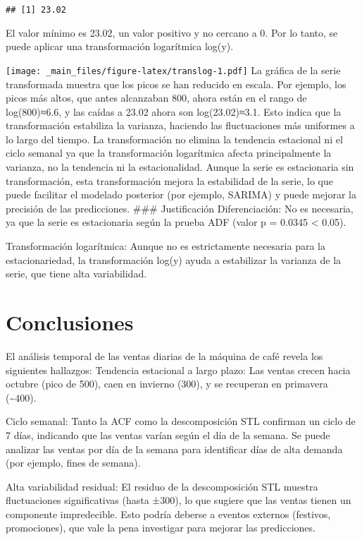 \documentclass[
]{book}
\begin{document}
\begin{verbatim}
## [1] 23.02
\end{verbatim}

El valor mínimo es 23.02, un valor positivo y no cercano a 0. Por lo tanto, se puede aplicar una transformación logarítmica log⁡(y).

\texttt{[image: \_main\_files/figure-latex/translog-1.pdf]}
La gráfica de la serie transformada muestra que los picos se han reducido en escala. Por ejemplo, los picos más altos, que antes alcanzaban 800, ahora están en el rango de log⁡(800)≈6.6, y las caídas a 23.02 ahora son log⁡(23.02)≈3.1. Esto indica que la transformación estabiliza la varianza, haciendo las fluctuaciones más uniformes a lo largo del tiempo. La transformación no elimina la tendencia estacional ni el ciclo semanal ya que la transformación logarítmica afecta principalmente la varianza, no la tendencia ni la estacionalidad.
Aunque la serie es estacionaria sin transformación, esta transformación mejora la estabilidad de la serie, lo que puede facilitar el modelado posterior (por ejemplo, SARIMA) y puede mejorar la precisión de las predicciones.
\#\#\# Justificación
Diferenciación: No es necesaria, ya que la serie es estacionaria según la prueba ADF (valor p = 0.0345 \textless{} 0.05).

Transformación logarítmica: Aunque no es estrictamente necesaria para la estacionariedad, la transformación log⁡(y)
ayuda a estabilizar la varianza de la serie, que tiene alta variabilidad.

\section{Conclusiones}\label{conclusiones}

El análisis temporal de las ventas diarias de la máquina de café revela los siguientes hallazgos:
Tendencia estacional a largo plazo: Las ventas crecen hacia octubre (pico de 500), caen en invierno (300), y se recuperan en primavera (\textasciitilde400).

Ciclo semanal: Tanto la ACF como la descomposición STL confirman un ciclo de 7 días, indicando que las ventas varían según el día de la semana. Se puede analizar las ventas por día de la semana para identificar días de alta demanda (por ejemplo, fines de semana).

Alta variabilidad residual: El residuo de la descomposición STL muestra fluctuaciones significativas (hasta ±300), lo que sugiere que las ventas tienen un componente impredecible. Esto podría deberse a eventos externos (festivos, promociones), que vale la pena investigar para mejorar las predicciones.
\end{document}
